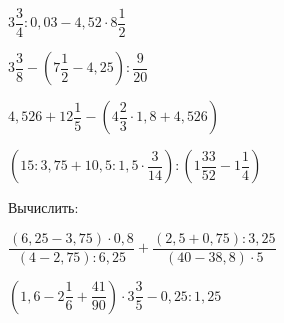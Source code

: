 \begin{enumcols}[label=\textbf{\arabic*.}]
	\begin{enumcols}[itemcolumns=2]
		\item \( 3\dfrac{3}{4}:0,03-4,52\cdot8\dfrac{1}{2} \)
		\item \( 3\dfrac{3}{8}-\left( 7\dfrac{1}{2}-4,25 \right):\dfrac{9}{20} \)
		\item \( 4,526+12\dfrac{1}{5}-\left( 4\dfrac{2}{3}\cdot1,8+4,526 \right) \)
		\item \( \left( 15:3,75+10,5:1,5\cdot\dfrac{3}{14} \right):\left( 1\dfrac{33}{52}-1\dfrac{1}{4} \right) \)
	\end{enumcols}
	\item Вычислить:
	\begin{enumcols}[itemcolumns=1]
		\item \( \dfrac{(6,25-3,75)\cdot0,8}{(4-2,75):6,25}+\dfrac{(2,5+0,75):3,25}{(40-38,8)\cdot5} \)
		\item \( \left( 1,6-2\dfrac{1}{6}+\dfrac{41}{90} \right)\cdot3\dfrac{3}{5}-0,25:1,25 \)
	\end{enumcols}
\end{enumcols}